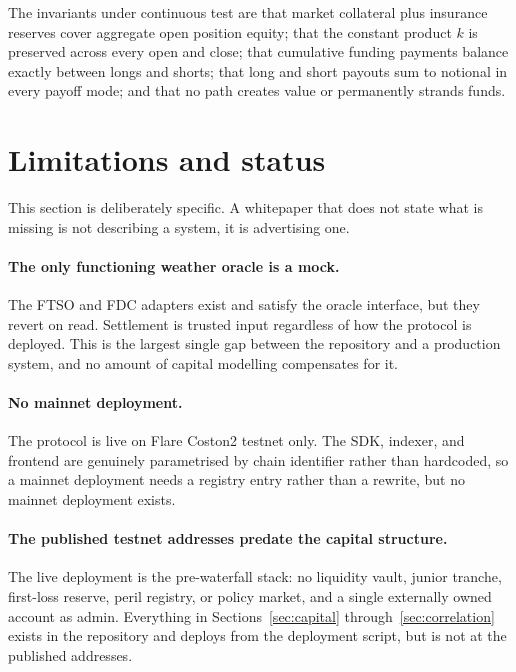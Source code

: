 \documentclass[11pt,a4paper]{article}
\begin{document}
The invariants under continuous test are that market collateral plus insurance reserves cover
aggregate open position equity; that the constant product $k$ is preserved across every open
and close; that cumulative funding payments balance exactly between longs and shorts; that
long and short payouts sum to notional in every payoff mode; and that no path creates value
or permanently strands funds.

\section{Limitations and status}
\label{sec:limits}

This section is deliberately specific. A whitepaper that does not state what is missing is
not describing a system, it is advertising one.

\paragraph{The only functioning weather oracle is a mock.} The FTSO and FDC adapters exist
and satisfy the oracle interface, but they revert on read. Settlement is trusted input
regardless of how the protocol is deployed. This is the largest single gap between the
repository and a production system, and no amount of capital modelling compensates for it.

\paragraph{No mainnet deployment.} The protocol is live on Flare Coston2 testnet only. The
SDK, indexer, and frontend are genuinely parametrised by chain identifier rather than
hardcoded, so a mainnet deployment needs a registry entry rather than a rewrite, but no
mainnet deployment exists.

\paragraph{The published testnet addresses predate the capital structure.} The live
deployment is the pre-waterfall stack: no liquidity vault, junior tranche, first-loss
reserve, peril registry, or policy market, and a single externally owned account as admin.
Everything in Sections~\ref{sec:capital} through~\ref{sec:correlation} exists in the
repository and deploys from the deployment script, but is not at the published addresses.
\end{document}
